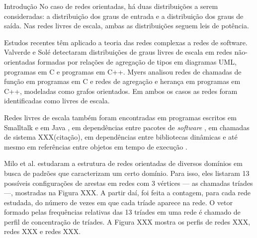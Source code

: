 \begin{section}{Introdução}
No caso de redes orientadas, há duas distribuições a serem consideradas: a distribuição dos graus de entrada e a distribuição dos graus de saída. Nas redes livres de escala, ambas as distribuições seguem leis de potência.

Estudos recentes têm aplicado a teoria das redes complexas a redes de software. Valverde e Solé \cite{Valverde2003} detectaram distribuições de graus livres de escala em redes não-orientadas formadas por relações de agregação de tipos em diagramas UML, programas em C e programas em C++. Myers \cite{Myers2003} analisou redes de chamadas de função em programas em C e redes de agregação e herança em programas em C++, modeladas como grafos orientados. Em ambos os casos as redes foram identificadas como livres de escala. 

Redes livres de escala também foram encontradas em programas escritos em Smalltalk \cite{Marchesi2004,Concas2007} e em Java \cite{Hyland-Wood2006,Baxter2006,Ichii2008}, em dependências entre pacotes de \textit{software} \cite{Labelle2004}, em chamadas de sistema XXX(citação), em dependências entre bibliotecas dinâmicas \cite{Louridas2008} e até mesmo em referências entre objetos em tempo de execução \cite{Potanin2005}.

Milo et al. \cite{Milo2002} estudaram a estrutura de redes orientadas de diversos domínios em busca de padrões que caracterizam um certo domínio. Para isso, eles listaram 13 possíveis configurações de arestas em redes com 3 vértices --- as chamadas tríades ---, mostradas na Figura XXX. A partir daí, foi feita a contagem, para cada rede estudada, do número de vezes em que cada tríade aparece na rede. O vetor formado pelas frequências relativas das 13 tríades em uma rede é chamado de perfil de concentração de tríades. A Figura XXX mostra os perfis de redes XXX, redes XXX e redes XXX.

\end{section}

